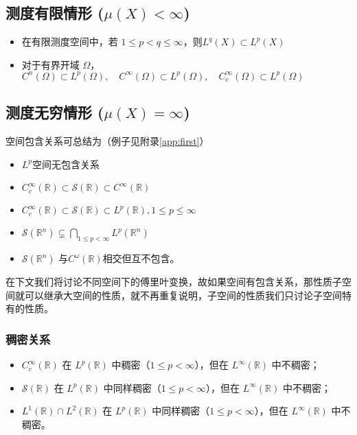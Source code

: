 \documentclass[12pt,a4paper]{article}
\theoremstyle{plain}
\theoremstyle{definition}
\theoremstyle{remark}
\begin{document}
	\subsection{测度有限情形 ($\mu(X)<\infty$)}
	\begin{itemize}
\item		在有限测度空间中，若 $1\leq p<q\le\infty$，则$	L^q(X)\subset L^p(X)$
\item	对于有界开域 $\Omega$，$	C^n(\Omega)\subset L^p(\Omega),\quad
	C^\infty(\Omega)\subset L^p(\Omega),\quad
	C_c^\infty(\Omega)\subset L^p(\Omega)$
\end{itemize}
	
	\subsection{测度无穷情形 ($\mu(X)=\infty$)}
	空间包含关系可总结为（例子见附录\ref{app:first}）
\begin{itemize}
	\item$ L^p$空间无包含关系
\item	$	C_c^\infty(\mathbb{R}) \subset \mathcal{S}(\mathbb{R}) \subset C^\infty(\mathbb{R})$
\item	$C_c^\infty(\mathbb{R}) \subset \mathcal{S}(\mathbb{R}) \subset  L^p(\mathbb{R}) ,1\leq p\le\infty$
\item	$\mathcal{S}(\mathbb{R}^n) \subsetneq \bigcap_{1 \leq p < \infty} L^p(\mathbb{R}^n)$
\item	 $\mathcal{S}(\mathbb{R}^n)$ 与$ C^\omega(\mathbb{R})$相交但互不包含。
\end{itemize}
 
 
 
在下文我们将讨论不同空间下的傅里叶变换，故如果空间有包含关系，那性质子空间就可以继承大空间的性质，就不再重复说明，子空间的性质我们只讨论子空间特有的性质。

\subsubsection{稠密关系}
\begin{itemize}
\item $C_c^\infty(\mathbb{R})$ 在 $L^p(\mathbb{R})$ 中稠密（$1 \leq p < \infty$），但在 $L^\infty(\mathbb{R})$ 中不稠密；
 
	\item $\mathcal{S}(\mathbb{R})$ 在 $L^p(\mathbb{R})$ 中同样稠密（$1 \leq p < \infty$），但在 $L^\infty(\mathbb{R})$ 中不稠密；
	 
	 \item $ L^1(\mathbb{R}) \cap L^2(\mathbb{R})$ 在 $L^p(\mathbb{R})$ 中同样稠密（$1 \leq p < \infty$），但在 $L^\infty(\mathbb{R})$ 中不稠密。
	\end{itemize}
\end{document}
